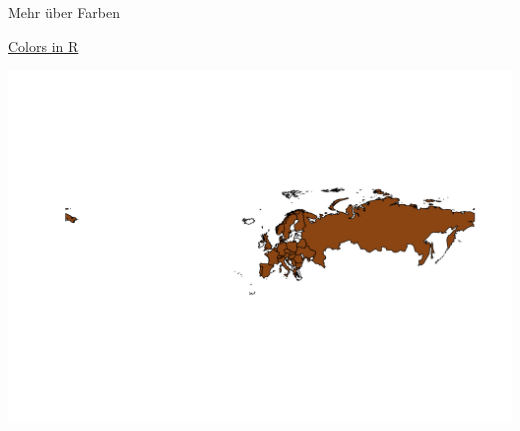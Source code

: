 \documentclass[ignorenonframetext,]{beamer}
\newenvironment{Shaded}{\begin{snugshade}}{\end{snugshade}}
\newcommand{\KeywordTok}[1]{\textcolor[rgb]{0.26,0.66,0.93}{\textbf{#1}}}
\newcommand{\DataTypeTok}[1]{\textcolor[rgb]{0.74,0.68,0.62}{\underline{#1}}}
\newcommand{\StringTok}[1]{\textcolor[rgb]{0.02,0.61,0.04}{#1}}
\newcommand{\OperatorTok}[1]{\textcolor[rgb]{0.74,0.68,0.62}{#1}}
\newcommand{\NormalTok}[1]{\textcolor[rgb]{0.74,0.68,0.62}{#1}}
\begin{document}
\begin{frame}[fragile]{Mehr über Farben}

\href{http://www.stat.columbia.edu/~tzheng/files/Rcolor.pdf}{Colors in
R}

\begin{Shaded}
\end{Shaded}

\includegraphics{Geomedizin_files/figure-beamer/unnamed-chunk-63-1.pdf}

\end{frame}
\end{document}

